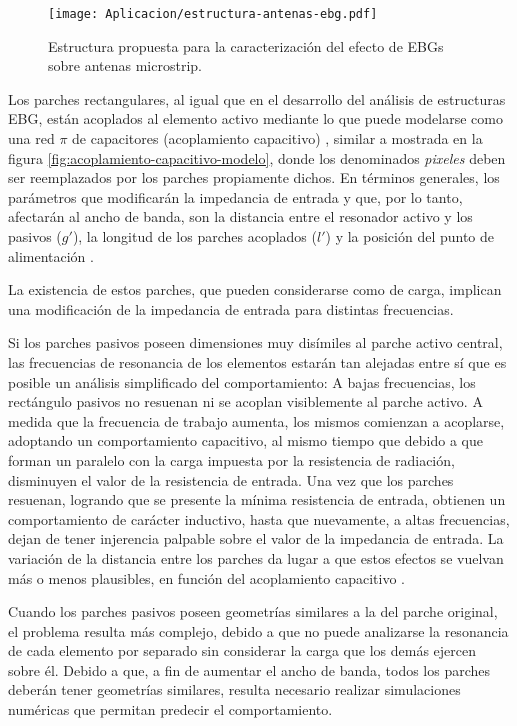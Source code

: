 \begin{figure}[h]
	\centering
	\texttt{[image: Aplicacion/estructura-antenas-ebg.pdf]}
	\caption{Estructura propuesta para la caracterización del efecto de EBGs sobre antenas microstrip.}
	\label{fig:antena-propuesta-con-ebg}
\end{figure}


Los parches rectangulares, al igual que en el desarrollo del análisis de estructuras EBG, están acoplados al elemento activo mediante lo que puede modelarse como una red $\pi$ de capacitores (acoplamiento capacitivo) \cite{Kumar:Non-radiating}, similar a mostrada en la figura \ref{fig:acoplamiento-capacitivo-modelo}, donde los denominados \textit{pixeles} deben ser reemplazados por los parches propiamente dichos. En términos generales, los parámetros que modificarán la impedancia de entrada y que, por lo tanto, afectarán al ancho de banda, son la distancia entre el resonador activo y los pasivos ($g'$), la longitud de los parches acoplados ($l'$) y la posición del punto de alimentación \cite{Kumar:Non-radiating}.

La existencia de estos parches, que pueden considerarse como de carga, implican una modificación de la impedancia de entrada para distintas frecuencias.

Si los parches pasivos poseen dimensiones muy disímiles al parche activo central, las frecuencias de resonancia de los elementos estarán tan alejadas entre sí que es posible un análisis simplificado del comportamiento: A bajas frecuencias, los rectángulo pasivos no resuenan ni se acoplan visiblemente al parche activo. A medida que la frecuencia de trabajo aumenta, los mismos comienzan a acoplarse, adoptando un comportamiento capacitivo, al mismo tiempo que debido a que forman un paralelo con la carga impuesta por la resistencia de radiación, disminuyen el valor de la resistencia de entrada. Una vez que los parches resuenan, logrando que se presente la mínima resistencia de entrada, obtienen un comportamiento de carácter inductivo, hasta que nuevamente, a altas frecuencias, dejan de tener injerencia palpable sobre el valor de la impedancia de entrada. La variación de la distancia entre los parches da lugar a que estos efectos se vuelvan más o menos plausibles, en función del acoplamiento capacitivo \cite{Kumar:Non-radiating}.

Cuando los parches pasivos poseen geometrías similares a la del parche original, el problema resulta más complejo, debido a que no puede analizarse la resonancia de cada elemento por separado sin considerar la carga que los demás ejercen sobre él. Debido a que, a fin de aumentar el ancho de banda, todos los parches deberán tener geometrías similares, resulta necesario realizar simulaciones numéricas que permitan predecir el comportamiento.

